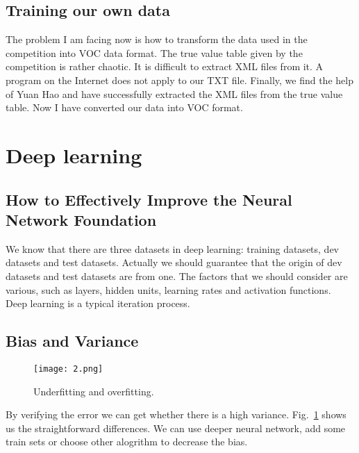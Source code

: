 \documentclass[a4paper]{article}
\begin{document}
\subsection{Training our own data}
The problem I am facing now is how to transform the data used in the competition into VOC data format. The true value table given by the competition is rather chaotic. It is difficult to extract XML files from it. A program on the Internet does not apply to our TXT file. Finally, we find the help of Yuan Hao and have successfully extracted the XML files from the true value table. Now I have converted our data into VOC format.
\section{Deep learning \cite{note1}}
\subsection{How to Effectively Improve the Neural Network Foundation}
We know that there are three datasets in deep learning: training datasets, dev datasets and test datasets. Actually we should guarantee that the origin of dev datasets and test datasets are from one. The factors that we should consider are various, such as layers, hidden units, learning rates and activation functions. Deep learning is a typical iteration process.
\subsection{Bias and Variance}
\begin{figure}
\begin{center}
  \texttt{[image: 2.png]}\\
  \caption{Underfitting and overfitting.}\label{4}
\end{center}
\end{figure}
By verifying the error we can get whether there is a high variance. Fig.~\ref{4} shows us the straightforward differences. We can use deeper neural network, add some train sets or choose other alogrithm to decrease the bias.
\end{document}
